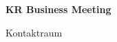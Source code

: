 \documentclass[a4paper]{article}
\begin{document}
\printGenericVSLHeader
\begin{center}
\begin{vsltext}{2.5cm}{4cm}

   \vspace{0.5cm} 

    \textbf{KR Business Meeting} 

    \vspace{1.5cm}

    Kontaktraum 

\end{vsltext}

\end{center}
\end{document}
